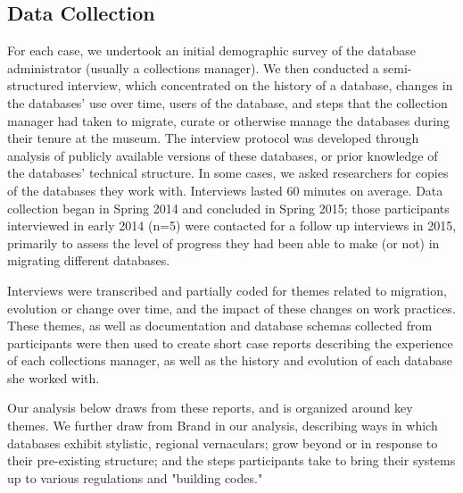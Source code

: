 \subsection{Data Collection}

For each case, we undertook an initial demographic survey of the database administrator (usually a collections manager). We then conducted a semi-structured interview, which concentrated on the history of a database, changes in the databases’ use over time, users of the database, and steps that the collection manager had taken to migrate, curate or otherwise manage the databases during their tenure at the museum. The interview protocol was developed through analysis of publicly available versions of these databases, or prior knowledge of the databases’ technical structure. In some cases, we asked researchers for copies of the databases they work with. Interviews lasted 60 minutes on average. Data collection began in Spring 2014 and concluded in Spring 2015; those participants interviewed in early 2014 (n=5) were contacted for a follow up interviews in 2015, primarily to assess the level of progress they had been able to make (or not) in migrating different databases.

Interviews were transcribed and partially coded for themes related to migration, evolution or change over time, and the impact of these changes on work practices. These themes, as well as documentation and database schemas collected from participants were then used to create short case reports describing the experience of each collections manager, as well as the history and evolution of each database she worked with. 

Our analysis below draws from these reports, and is organized around key themes. We further draw from Brand in our analysis, describing ways in which databases exhibit stylistic, regional vernaculars; grow beyond or in response to their pre-existing structure; and the steps participants take to bring their systems up to various regulations and "building codes."\